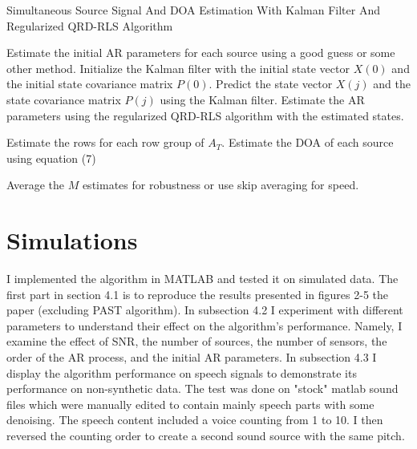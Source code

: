 \documentclass{article}
\begin{document}
\begin{algorithm}[htbp]
    \caption{Simultaneous Source Signal And DOA Estimation With Kalman Filter And Regularized QRD-RLS Algorithm}
    \label{alg:KF_RQRD_RLS}
    \begin{algorithmic}[1]
            \State Estimate the initial AR parameters for each source using a good guess or some other method.
            \State Initialize the Kalman filter with the initial state vector $X(0)$ and the initial state covariance matrix $P(0)$.
        \EndProcedure
                    \State Predict the state vector $X(j)$ and the state covariance matrix $P(j)$ using the Kalman filter.
                \EndFor
                \State Estimate the AR parameters using the regularized QRD-RLS algorithm with the estimated states.
                
                    \State Estimate the rows for each row group of $A_T$.
                    \State Estimate the DOA of each source using equation (7) 
                \EndFor

                \State Average the $M$ estimates for robustness or use skip averaging for speed.
        
            \EndFor
        \EndProcedure
    \end{algorithmic}
\end{algorithm}




\section{Simulations}

I implemented the algorithm in MATLAB and tested it on simulated data.
The first part in section 4.1 is to reproduce the results presented in figures 2-5 the paper (excluding PAST algorithm).
In subsection 4.2 I experiment with different parameters to understand their effect on the algorithm's performance.
Namely, I examine the effect of SNR, the number of sources, the number of sensors, the order of the AR process, and the initial AR parameters.
In subsection 4.3 I display the algorithm performance on speech signals to demonstrate its performance on non-synthetic data.
The test was done on "stock" matlab sound files which were manually edited to contain mainly speech parts with some denoising.
The speech content included a voice counting from 1 to 10. I then reversed the counting order to create a second sound source with the same pitch.
\end{document}
